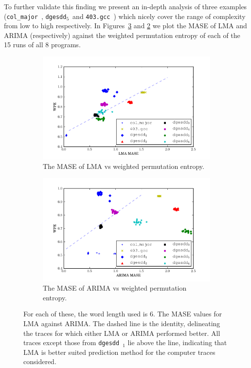 \documentclass{article}
\newcommand{\gcc}{{\tt 403.gcc}~}
\newcommand{\svd}{{\tt dgesdd}~}
\newcommand{\svdfive}{{\tt dgesdd$_5$}~}
\newcommand{\col}{{\tt col\_major}~}
\begin{document}
To further validate this finding we present an in-depth analysis of three examples (\col, \svdfive and \gcc ) which nicely cover the range of complexity from low to high respectively. In Figures~\ref{fig:lma_vs_arima} and \ref{fig:arima_pred_vs_ent} we plot the MASE of LMA and ARIMA (respectively) against the weighted permutation entropy of each of the 15 runs of all 8 programs.


\begin{figure}[htbp]
  \centering
       
  \begin{subfigure}{0.5\textwidth}
    \includegraphics[width=\textwidth]{figs/LMA_prediction_vs_entropy}
    \caption{The MASE of LMA vs weighted permutation entropy. }
    \label{fig:lma_pred_vs_ent}
  \end{subfigure}%
  \begin{subfigure}{0.5\textwidth}
    \includegraphics[width=\textwidth]{figs/ARIMA_prediction_vs_entropy}
    \caption{The MASE of ARIMA vs weighted permutation entropy. }
    \label{fig:arima_pred_vs_ent}
  \end{subfigure}
\caption{
For each of these, the word length used is $6$. The MASE values for LMA against ARIMA. The dashed line is the identity, delineating the traces for which either LMA or ARIMA performed better. All traces except those from \svd$_1$ lie above the line, indicating that LMA is better suited prediction method for the computer traces considered.}\label{fig:lma_vs_arima}  
\end{figure} 
\end{document}

